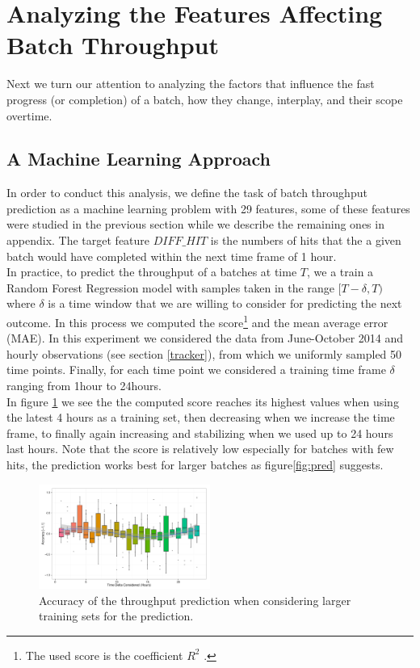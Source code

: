 \section{Analyzing the Features Affecting Batch Throughput}\label{sec:throughput}
Next we turn our attention to analyzing the factors that influence the fast progress (or completion) of a batch, how they change, interplay, and their scope overtime.
\subsection{A Machine Learning Approach}
In order to conduct this analysis, we define the task of batch throughput prediction as a machine learning problem with 29 features, some of these features were studied in the previous section while we describe the remaining ones in appendix. The target feature $DIFF\_HIT$ is the numbers of hits that the a given batch would have completed within the next time frame of 1 hour.\\
In practice, to predict the throughput of a batches at time $T$, we a train a Random Forest Regression model with samples taken in the range $[T-\delta, T)$ where $\delta$ is a time window that we are willing to consider for predicting the next outcome. In this process we computed the score\footnote{The used score is the coefficient $R^2$ \cite{sklearn}.} and the mean average error (MAE).
In this experiment we considered the data from June-October 2014 and hourly observations (see section \ref{tracker}), from which we uniformly sampled 50 time points. Finally, for each time point we considered a training time frame $\delta$ ranging from 1hour to 24hours. \\

In figure \ref{fig:accuracy} we see the the computed score reaches its highest values when using the latest 4 hours as a training set, then decreasing when we increase the time frame, to finally again increasing and stabilizing when we used up to 24 hours last hours. Note that the score is relatively low especially for batches with few hits, the prediction works best for larger batches as figure\ref{fig:pred} suggests.\\

\begin{figure}[htbp]
	\centering
		\includegraphics[width=0.5\textwidth]{figures/ML_accuracy}
	\caption{Accuracy of the throughput prediction when considering larger training sets for the prediction.}
	\label{fig:accuracy}
\end{figure}

